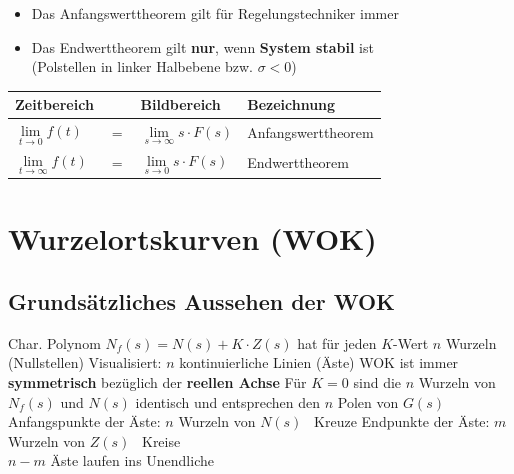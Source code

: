 \smallskip

\begin{itemize}
    \item Das Anfangswerttheorem gilt für Regelungstechniker immer
    \item Das Endwerttheorem gilt \textbf{nur}, wenn \textbf{System stabil} ist \\
        (Polstellen in linker Halbebene bzw. $\sigma < 0$)
\end{itemize}

\begin{center}
    \begin{tabular}{l c ll}
        \toprule
        \textbf{Zeitbereich}                &       & \textbf{Bildbereich}                          & \textbf{Bezeichnung}      \\
        \midrule
        $\lim\limits_{t \to 0} f(t)$        & $=$   & $\lim\limits_{s \to \infty} s \cdot F(s)$     & Anfangswerttheorem        \\
        \midrule
        $\lim\limits_{t \to \infty} f(t)$   & $=$   & $\lim\limits_{s \to 0} s \cdot F(s)$          & Endwerttheorem            \\
        \bottomrule
    \end{tabular}
\end{center}



\section{Wurzelortskurven (WOK)}
\label{Wurzelortskurven (WOK)}

\subsection{Grundsätzliches Aussehen der WOK}

\begin{outline}
    \1 Char. Polynom $N_f(s) = N(s) + K \cdot Z(s)$ hat für jeden $K$-Wert $n$ Wurzeln (Nullstellen)
        \2 Visualisiert: $n$ kontinuierliche Linien (Äste)
    \1 WOK ist immer \textbf{symmetrisch} bezüglich der \textbf{reellen Achse}
    \1 Für $K = 0$ sind die $n$ Wurzeln von $N_f(s)$ und $N(s)$ identisch und entsprechen den $n$ Polen von $G(s)$
    \1 Anfangspunkte der Äste: $n$ Wurzeln von $N(s)$ \textrightarrow\ Kreuze
    \1 Endpunkte der Äste: $m$ Wurzeln von $Z(s)$ \textrightarrow\ Kreise \\
        $n-m$ Äste laufen ins Unendliche
\end{outline}


